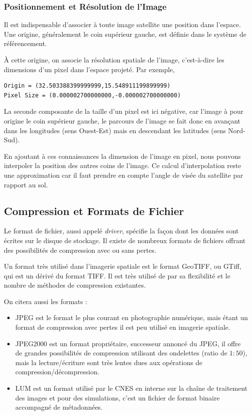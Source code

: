 \documentclass[a4paper, 11pt]{report}
\begin{document}
\subsubsection{Positionnement et Résolution de l'Image}
Il est indispensable d'associer à toute image satellite une position dans l'espace. Une origine, généralement le coin supérieur gauche, est définie dans le système de référencement.

À cette origine, on associe la résolution spatiale de l'image, c'est-à-dire les dimensions d'un pixel dans l'espace projeté.
Par exemple,
\begin{verbatim}
Origin = (32.503388399999999,15.548911199899999)
Pixel Size = (0.000002700000000,-0.000002700000000)
\end{verbatim}
La seconde composante de la taille d'un pixel est ici négative, car l'image à pour origine le coin supérieur gauche, le parcours de l'image se fait donc en avançant dans les longitudes (sens Ouest-Est) mais en descendant les latitudes (sens Nord-Sud).

En ajoutant à ces connaissances la dimension de l'image en pixel, nous pouvons interpoler la position des autres coins de l'image. Ce calcul d'interpolation reste une approximation car il faut prendre en compte l'angle de visée du satellite par rapport au sol.

\subsection{Compression et Formats de Fichier}
Le format de fichier, aussi appelé \emph{driver}, spécifie la façon dont les données sont écrites sur le disque de stockage.
Il existe de nombreux formats de fichiers offrant des possibilités de compression avec ou sans pertes.

Un format très utilisé dans l'imagerie spatiale est le format GeoTIFF, ou GTiff, qui est un dérivé du format TIFF. Il est très utilisé de par sa flexibilité et le nombre de méthodes de compression existantes.

On citera aussi les formats :
\begin{itemize}
	\item JPEG est le format le plus courant en photographie numérique, mais étant un format de compression avec pertes il est peu utilisé en imagerie spatiale.
	\item JPEG2000 est un format propriétaire, successeur annoncé du JPEG, il offre de grandes possibilités de compression utilisant des ondelettes (ratio de $1:50$), mais la lecture/écriture sont très lentes dues aux opérations de compression/décompression.
	\item LUM est un format utilisé par le CNES en interne sur la chaîne de traitement des images et pour des simulations, c'est un fichier de format binaire accompagné de métadonnées.
\end{itemize}
\end{document}
